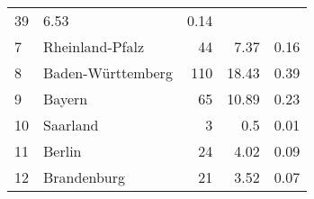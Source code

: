\begin{longtable}{lXrrr}
       \num{39} &
       \num[round-mode=places,round-precision=2]{6,53} &
         \num[round-mode=places,round-precision=2]{0,14} \\

     7 &
     \multicolumn{1}{X}{ Rheinland-Pfalz   } &


       \num{44} &
       \num[round-mode=places,round-precision=2]{7,37} &
         \num[round-mode=places,round-precision=2]{0,16} \\

     8 &
     \multicolumn{1}{X}{ Baden-Württemberg   } &


       \num{110} &
       \num[round-mode=places,round-precision=2]{18,43} &
         \num[round-mode=places,round-precision=2]{0,39} \\

     9 &
     \multicolumn{1}{X}{ Bayern   } &


       \num{65} &
       \num[round-mode=places,round-precision=2]{10,89} &
         \num[round-mode=places,round-precision=2]{0,23} \\

     10 &
     \multicolumn{1}{X}{ Saarland   } &


       \num{3} &
       \num[round-mode=places,round-precision=2]{0,5} &
         \num[round-mode=places,round-precision=2]{0,01} \\

     11 &
     \multicolumn{1}{X}{ Berlin   } &


       \num{24} &
       \num[round-mode=places,round-precision=2]{4,02} &
         \num[round-mode=places,round-precision=2]{0,09} \\

     12 &
     \multicolumn{1}{X}{ Brandenburg   } &


       \num{21} &
       \num[round-mode=places,round-precision=2]{3,52} &
         \num[round-mode=places,round-precision=2]{0,07} \\


\end{longtable}
